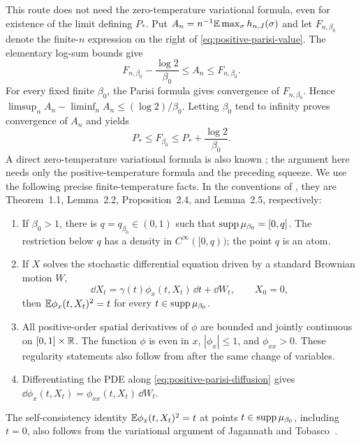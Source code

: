 This route does not need the zero-temperature variational formula,
even for existence of the limit defining $P_*$. Put
$A_n=n^{-1}\mathbb E\max_\sigma h_{n,J}(\sigma)$ and
let $F_{n,\beta_0}$ denote the finite-$n$ expression on the right of
\eqref{eq:positive-parisi-value}. The elementary log-sum bounds give
\[
 F_{n,\beta_0}-\frac{\log2}{\beta_0}
 \le A_n\le F_{n,\beta_0}.
\]
For every fixed finite $\beta_0$, the Parisi formula gives convergence
of $F_{n,\beta_0}$. Hence
$\limsup_n A_n-\liminf_n A_n\le(\log2)/\beta_0$.
Letting $\beta_0$ tend to infinity proves convergence of $A_n$ and yields
\begin{equation}
 P_*\le F_{\beta_0}\le P_*+\frac{\log2}{\beta_0}.
 \label{eq:positive-free-energy-bounds}
\end{equation}
A direct zero-temperature variational formula is also known
\cite[Theorem~1]{AC2017}; the argument here needs only the
positive-temperature formula and the preceding squeeze. We use the
following precise finite-temperature facts.  In the conventions of
\cite{Lopatto2026}, they are Theorem~1.1, Lemma~2.2,
Proposition~2.4, and Lemma~2.5, respectively:
\begin{enumerate}
 \item If $\beta_0>1$, there is $q=q_{\beta_0}\in(0,1)$ such that
 $\operatorname{supp}\mu_{\beta_0}=[0,q]$.  The restriction below $q$ has a density
 in $C^\infty([0,q))$; the point $q$ is an atom.
 \item If $X$ solves the stochastic differential equation driven by
 a standard Brownian motion $W$,
 \begin{equation}
  \dd X_t=\gamma(t)\phi_x(t,X_t)\,\dd t+\dd W_t,
  \qquad X_0=0,
  \label{eq:positive-parisi-diffusion}
 \end{equation}
 then $\mathbb E\phi_x(t,X_t)^2=t$ for every
 $t\in\operatorname{supp}\mu_{\beta_0}$.
 \item All positive-order spatial derivatives of $\phi$ are bounded
 and jointly continuous on $[0,1]\times\mathbb R$.
 The function $\phi$ is even in $x$, $|\phi_x|\le1$, and
 $\phi_{xx}>0$.  These regularity statements also follow from
 \cite[Propositions~1--2 and Appendix Proposition~5, (66)]{AC2015}
 after the same change of variables.
 \item Differentiating the PDE along
 \eqref{eq:positive-parisi-diffusion} gives
 $\dd\phi_x(t,X_t)=\phi_{xx}(t,X_t)\,\dd W_t$.
\end{enumerate}
The self-consistency identity $\mathbb E\phi_x(t,X_t)^2=t$ at points
$t\in\operatorname{supp}\mu_{\beta_0}$, including $t=0$, also follows from the
variational argument of Jagannath and Tobasco~\cite[Proposition~1.1 and Corollary~3.10]{JT2017}.
